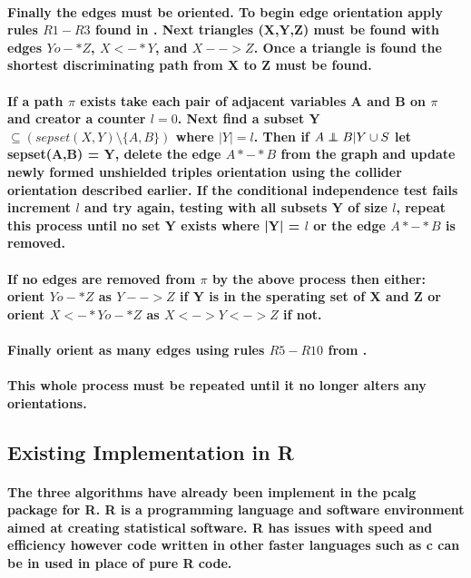 \documentclass{article}
\newcommand\independent{\protect\mathpalette{\protect\independenT}{\perp}}
\def\independenT#1#2{\mathrel{\rlap{$#1#2$}\mkern2mu{#1#2}}}
\begin{document}
\paragraph{Finally the edges must be oriented. To begin edge orientation apply rules $R1-R3$ found in \cite{ZHANG20081873}. Next triangles (X,Y,Z) must be found with edges $Yo-*Z$, $X<-*Y$, and $X-->Z$. Once a triangle is found the shortest discriminating path from X to Z must be found.}

\paragraph{If a path $\pi$ exists take each pair of adjacent variables A and B on $\pi$ and creator a counter $l = 0$. Next find  a subset Y  $\subseteq (sepset(X,Y) \setminus \{A,B\})$ where $|Y| = l$. Then if $A \independent B | Y \cup S$ let sepset(A,B) = Y, delete the edge $A*-*B$ from the graph and update newly formed unshielded triples orientation using the collider orientation described earlier. If the conditional independence test fails increment $l$ and try again, testing with all subsets Y of size $l$, repeat this process until no set Y exists where |Y| = $l$ or the edge $A*-*B$ is removed. 
}

\paragraph{If no edges are removed from $\pi$ by the above process then either: orient $Yo-*Z$ as $Y-->Z$ if Y is in the sperating set of X and Z or orient $X<-*Yo-*Z$ as $X<->Y<->Z$ if not.}

\paragraph{Finally orient as many edges using rules $R5-R10$ from \cite{ZHANG20081873}.}

\paragraph{This whole process must be repeated until it no longer alters any orientations.\cite{colombo2012learning}}


\subsection{Existing Implementation in R}

\paragraph{The three algorithms have already been implement in the pcalg package for R. R is a programming language and software environment aimed at creating statistical software. R has issues with speed and efficiency however code written in other faster languages such as c can be in used in place of pure R code.}
\end{document}
